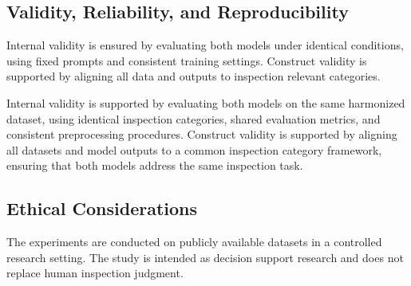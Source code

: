 \subsection{Validity, Reliability, and Reproducibility}
\label{subsec:validity_reliability}

Internal validity is ensured by evaluating both models under identical conditions, using fixed prompts and consistent training settings. Construct validity is supported by aligning all data and outputs to inspection relevant categories.

Internal validity is supported by evaluating both models on the same harmonized dataset, using identical inspection categories, shared evaluation metrics, and consistent preprocessing procedures. Construct validity is supported by aligning all datasets and model outputs to a common inspection category framework, ensuring that both models address the same inspection task.

\subsection{Ethical Considerations}
\label{subsec:ethical_considerations}

The experiments are conducted on publicly available datasets in a controlled research setting. The study is intended as decision support research and does not replace human inspection judgment.
